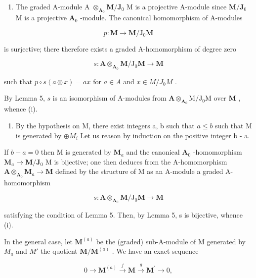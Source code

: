 \begin{enumerate}
\def\labelenumi{\alph{enumi})}
\tightlist
\item
  The graded A-module A \(\otimes_{\mathbf{A}_0}\mathbf{M} / \mathbf{J}_0\) M is a projective A-module since \(\mathbf{M} / \mathbf{J}_0\) M is a projective \(\mathbf{A}_0\) -module. The canonical homomorphism of A-modules
\end{enumerate}

\[
p: \mathbf {M} \rightarrow \mathbf {M} / \mathrm{J} _ {0} \mathbf {M}
\]

is surjective; there therefore exists a graded A-homomorphism of degree zero

\[
s: \mathbf {A} \otimes_ {\mathbf {A} _ {0}} \mathbf {M} / \mathrm{J} _ {0} \mathbf {M} \rightarrow \mathbf {M}
\]

such that \(p \circ s(a \otimes x) = ax\) for \(a \in A\) and \(x \in M / J_0 M\) .

By Lemma 5, \(s\) is an isomorphism of A-modules from \(\mathbf{A} \otimes_{\mathbf{A}_0} \mathrm{M} / \mathrm{J}_0 \mathrm{M}\) over \(\mathbf{M}\) , whence (i).

\begin{enumerate}
\def\labelenumi{\alph{enumi})}
\setcounter{enumi}{1}
\tightlist
\item
  By the hypothesis on M, there exist integers a, b such that \(a \leqslant b\) such that M is generated by \(\oplus M_{i}\) Let us reason by induction on the positive integer b - a.
\end{enumerate}

If \(b - a = 0\) then M is generated by \(\mathbf{M}_a\) and the canonical \(\mathbf{A}_0\) -homomorphism \(\mathbf{M}_a \to \mathbf{M} / \mathbf{J}_0\) M is bijective; one then deduces from the A-homomorphism \(\mathbf{A} \otimes_{\mathbf{A}_0} \mathbf{M}_a \to \mathbf{M}\) defined by the structure of M as an A-module a graded A-homomorphism

\[
s: \mathbf {A} \otimes_ {\mathbf {A} _ {0}} \mathbf {M} / \mathrm{J} _ {0} \mathbf {M} \rightarrow \mathbf {M}
\]

satisfying the condition of Lemma 5. Then, by Lemma 5, s is bijective, whence (i).

In the general case, let \(\mathbf{M}^{(a)}\) be the (graded) sub-A-module of M generated by \(M_{a}\) and \(M'\) the quotient \(\mathbf{M}/\mathbf{M}^{(a)}\) . We have an exact sequence

\[
0 \to \mathbf {M} ^ {(a)} \xrightarrow {f} \mathbf {M} \xrightarrow {g} \mathbf {M} ^ {\prime} \to 0,
\]

